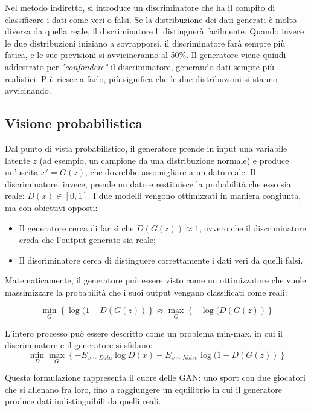 Nel metodo indiretto, si introduce un discriminatore che ha il compito di classificare i dati come veri o falsi. Se la distribuzione dei dati generati è molto diversa da quella reale, il discriminatore li distinguerà facilmente. Quando invece le due distribuzioni iniziano a sovrapporsi, il discriminatore farà sempre più fatica, e le sue previsioni si avvicineranno al 50\%. Il generatore viene quindi addestrato per \textit{"confondere"} il discriminatore, generando dati sempre più realistici. Più riesce a farlo, più significa che le due distribuzioni si stanno avvicinando.

\subsection{Visione probabilistica}

Dal punto di vista probabilistico, il generatore prende in input una variabile latente $z$ (ad esempio, un campione da una distribuzione normale) e produce un’uscita $x' = G(z)$, che dovrebbe assomigliare a un dato reale. Il discriminatore, invece, prende un dato e restituisce la probabilità che esso sia reale: $D(x) \in [0,1]$. I due modelli vengono ottimizzati in maniera congiunta, ma con obiettivi opposti:
\begin{itemize}
    \item Il generatore cerca di far sì che $D(G(z)) \approx 1$, ovvero che il discriminatore creda che l’output generato sia reale;
    \item Il discriminatore cerca di distinguere correttamente i dati veri da quelli falsi.
\end{itemize}

Matematicamente, il generatore può essere visto come un ottimizzatore che vuole massimizzare la probabilità che i suoi output vengano classificati come reali:

\begin{equation}
    \min_G \left\{ \log(1-D(G(z))\right\}\approx \max_G\left\{-\log(D(G(z))\right\}
\end{equation}

L’intero processo può essere descritto come un problema min-max, in cui il discriminatore e il generatore si sfidano:
\begin{equation}
    \min_D\max_G\left\{-E_{x\sim Data} \log D(x) - E_{x\sim Noise}\log(1-D(G(z))\right\}
\end{equation}

Questa formulazione rappresenta il cuore delle GAN: uno sport con due giocatori che si allenano fra loro, fino a raggiungere un equilibrio in cui il generatore produce dati indistinguibili da quelli reali.